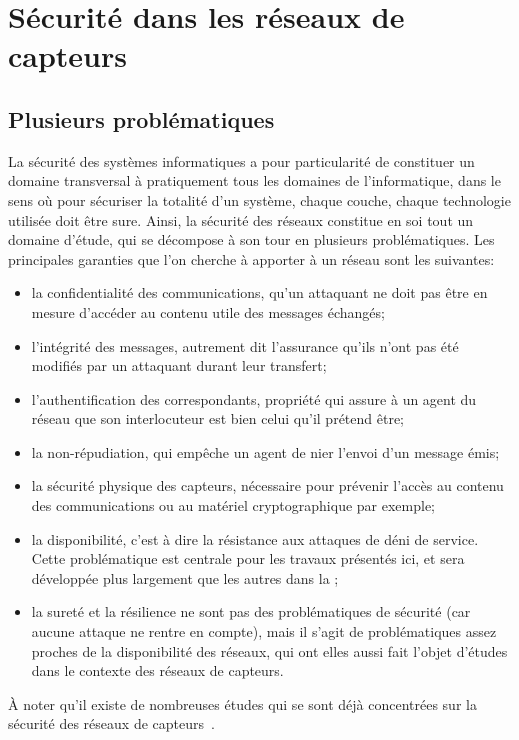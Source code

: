 \section{Sécurité dans les réseaux de capteurs}

\subsection{Plusieurs problématiques}

La sécurité des systèmes informatiques a pour particularité de constituer un domaine transversal à pratiquement tous les domaines de l'informatique, dans le sens où pour sécuriser la totalité d'un système, chaque couche, chaque technologie utilisée doit être sure.
Ainsi, la sécurité des réseaux constitue en soi tout un domaine d'étude, qui se décompose à son tour en plusieurs problématiques.
Les principales garanties que l'on cherche à apporter à un réseau sont les suivantes:
\begin{itemize}
    \item la confidentialité des communications, \cad qu'un attaquant ne doit pas être en mesure d'accéder au contenu utile des messages échangés;
    \item l'intégrité des messages, autrement dit l'assurance qu'ils n'ont pas été modifiés par un attaquant durant leur transfert;
    \item l'authentification des correspondants, propriété qui assure à un agent du réseau que son interlocuteur est bien celui qu'il prétend être;
    \item la non-répudiation, qui empêche un agent de nier l'envoi d'un message émis;
    \item la sécurité physique des capteurs, nécessaire pour prévenir l'accès au contenu des communications ou au matériel cryptographique par exemple;
    \item la disponibilité, c'est à dire la résistance aux attaques de déni de service. Cette problématique est centrale pour les travaux présentés ici, et sera développée plus largement que les autres dans la ;
    \item la sureté et la résilience ne sont pas des problématiques de sécurité (car aucune attaque ne rentre en compte), mais il s'agit de problématiques assez proches de la disponibilité des réseaux, qui ont elles aussi fait l'objet d'études dans le contexte des réseaux de capteurs.
\end{itemize}
À noter qu'il existe de nombreuses études qui se sont déjà concentrées sur la sécurité des réseaux de capteurs~\cite{DYK12,AD14}.

